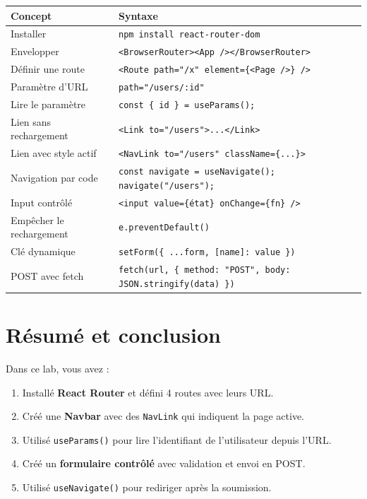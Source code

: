 \documentclass[11pt,a4paper]{article}
\begin{document}
\begin{center}
\begin{tabular}{lp{7.5cm}}
\toprule
\textbf{Concept} & \textbf{Syntaxe} \\
\midrule
Installer & \texttt{npm install react-router-dom} \\
Envelopper & \texttt{<BrowserRouter><App /></BrowserRouter>} \\
Définir une route & \texttt{<Route path="/x" element=\{<Page />\} />} \\
Paramètre d'URL & \texttt{path="/users/:id"} \\
Lire le paramètre & \texttt{const \{ id \} = useParams();} \\
Lien sans rechargement & \texttt{<Link to="/users">...</Link>} \\
Lien avec style actif & \texttt{<NavLink to="/users" className=\{...\}>} \\
Navigation par code & \texttt{const navigate = useNavigate(); navigate("/users");} \\
\midrule
Input contrôlé & \texttt{<input value=\{état\} onChange=\{fn\} />} \\
Empêcher le rechargement & \texttt{e.preventDefault()} \\
Clé dynamique & \texttt{setForm(\{ ...form, [name]: value \})} \\
POST avec fetch & \texttt{fetch(url, \{ method: "POST", body: JSON.stringify(data) \})} \\
\bottomrule
\end{tabular}
\end{center}

\newpage

\section{Résumé et conclusion}

Dans ce lab, vous avez :
\begin{enumerate}[nosep]
\item Installé \textbf{React Router} et défini 4 routes avec leurs URL.
\item Créé une \textbf{Navbar} avec des \texttt{NavLink} qui indiquent la page active.
\item Utilisé \texttt{useParams()} pour lire l'identifiant de l'utilisateur depuis l'URL.
\item Créé un \textbf{formulaire contrôlé} avec validation et envoi en POST.
\item Utilisé \texttt{useNavigate()} pour rediriger après la soumission.
\end{enumerate}
\end{document}
